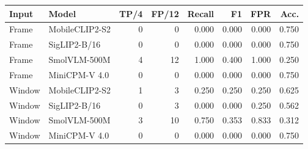\begin{longtable}{llrrrrrr}
\toprule
Input & Model & TP/4 & FP/12 & Recall & F1 & FPR & Acc. \\
\midrule\endhead
Frame & MobileCLIP2-S2 & 0 & 0 & 0.000 & 0.000 & 0.000 & 0.750 \\
Frame & SigLIP2-B/16 & 0 & 0 & 0.000 & 0.000 & 0.000 & 0.750 \\
Frame & SmolVLM-500M & 4 & 12 & 1.000 & 0.400 & 1.000 & 0.250 \\
Frame & MiniCPM-V 4.0 & 0 & 0 & 0.000 & 0.000 & 0.000 & 0.750 \\
Window & MobileCLIP2-S2 & 1 & 3 & 0.250 & 0.250 & 0.250 & 0.625 \\
Window & SigLIP2-B/16 & 0 & 3 & 0.000 & 0.000 & 0.250 & 0.562 \\
Window & SmolVLM-500M & 3 & 10 & 0.750 & 0.353 & 0.833 & 0.312 \\
Window & MiniCPM-V 4.0 & 0 & 0 & 0.000 & 0.000 & 0.000 & 0.750 \\
\bottomrule
\end{longtable}
